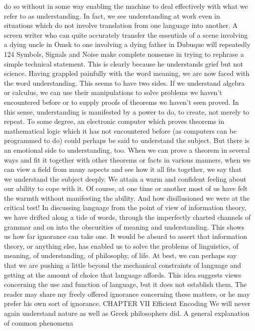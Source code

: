 {{{do so without in some way enabling the machine to deal effectively
with what we refer to as understanding. In fact, we see understanding
at work even in situations which do not involve translation
from one language into another. A screen writer who can quite
accurately transfer the essentials of a scene involving a dying uncle
in Omsk to one involving a dying father in Dubuque will repeatedly
124 Symbols, Signals and Noise
make complete nonsense in trying to rephrase a simple technical
statement. This is clearly because he understands grief but not
science.
Having grappled painfully with the word meaning, we are now
faced with the word understanding. This seems to have two sides.
If we understand algebra or calculus, we can use their manipulations
to solve problems we haven’t encountered before or to supply
proofs of theorems we haven’t seen proved. In this sense, understanding
is manifested by a power to do, to create, not merely to
repeat. To some degree, an electronic computer which proves
theorems in mathematical logic which it has not encountered before
(as computers can be programmed to do) could perhaps be
said to understand the subject. But there is an emotional side to
understanding, too. When we can prove a theorem in several ways
and fit it together with other theorems or facts in various manners,
when we can view a field from many aspects and see how it all fits
together, we say that we understand the subject deeply. We attain
a warm and confident feeling about our ability to cope with it. Of
course, at one time or another most of us have felt the warmth
without manifesting the ability. And how disillusioned we were at
the critical test!
In discussing language from the point of view of information
theory, we have drifted along a tide of words, through the imperfectly
charted channels of grammar and on into the obscurities of
meaning and understanding. This shows us how far ignorance can
take one. It would be absurd to assert that information theory, or
anything else, has enabled us to solve the problems of linguistics,
of meaning, of understanding, of philosophy, of life. At best, we
can perhaps say that we are pushing a little beyond the mechanical
constraints of language and getting at the amount of choice
that language affords. This idea suggests views concerning the use
and function of language, but it does not establish them. The
reader may share my freely offered ignorance concerning these
matters, or he may prefer his own sort of ignorance.
CHAPTER VII Efficient Encoding
We will never again understand nature as well as Greek
philosophers did. A general explanation of common phenomena
}}}
